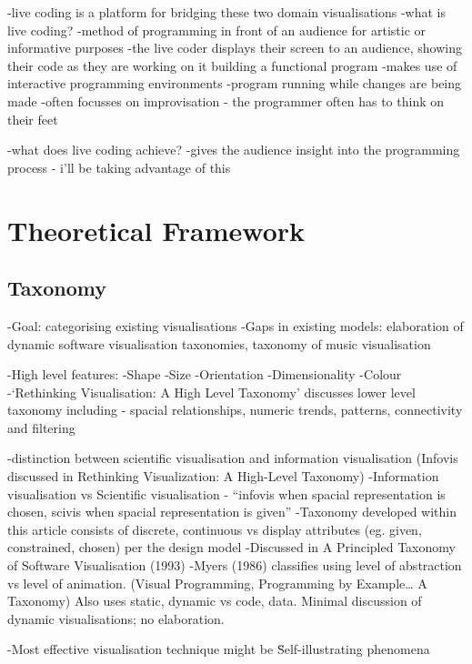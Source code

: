 -live coding is a platform for bridging these two domain visualisations 
-what is live coding?
-method of programming in front of an audience for artistic or informative purposes
-the live coder displays their screen to an audience, showing their code as they are working on it building a functional program
-makes use of interactive programming environments 
-program running while changes are being made 
-often focusses on improvisation - the programmer often has to think on their feet

-what does live coding achieve?
-gives the audience insight into the programming process - i’ll be taking advantage of this


\section{Theoretical Framework}
\label{sec:framework}




\subsection{Taxonomy}


-Goal: categorising existing visualisations
-Gaps in existing models: elaboration of dynamic software visualisation taxonomies, taxonomy of music visualisation

-High level features:
	-Shape
	-Size
	-Orientation
	-Dimensionality
	-Colour
-‘Rethinking Visualisation: A High Level Taxonomy' discusses lower level taxonomy including - spacial relationships, numeric trends, patterns, connectivity and filtering

-distinction between scientific visualisation and information visualisation (Infovis discussed in Rethinking Visualization: A High-Level Taxonomy)
-Information visualisation vs Scientific visualisation - “infovis when spacial representation is chosen, scivis when spacial representation is given”
-Taxonomy developed within this article consists of {discrete, continuous} vs display attributes (eg. given, constrained, chosen) per the design model
-Discussed in A Principled Taxonomy of Software Visualisation (1993)
-Myers (1986) classifies using level of abstraction vs level of animation. (Visual Programming, Programming by Example… A Taxonomy) Also uses {static, dynamic} vs {code, data}. Minimal discussion of dynamic visualisations; no elaboration.

-Most effective visualisation technique might be \"Self-illustrating phenomena\" \\

